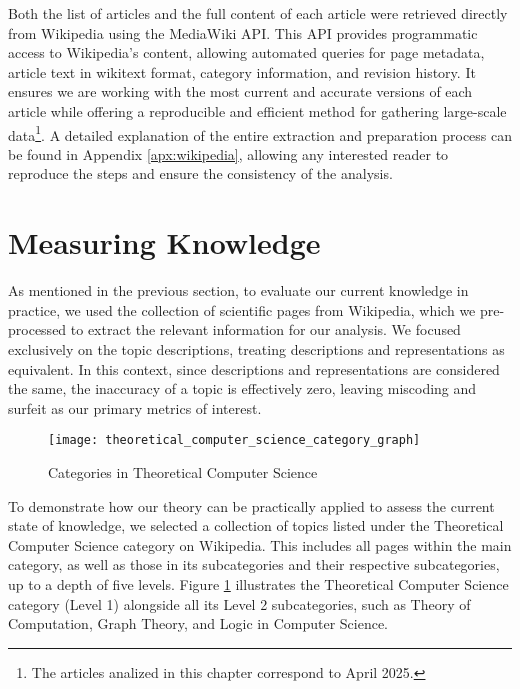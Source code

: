Both the list of articles and the full content of each article were retrieved directly from Wikipedia using the MediaWiki API. This API provides programmatic access to Wikipedia's content, allowing automated queries for page metadata, article text in wikitext format, category information, and revision history. It ensures we are working with the most current and accurate versions of each article while offering a reproducible and efficient method for gathering large-scale data\footnote{The articles analized in this chapter correspond to April 2025.}. A detailed explanation of the entire extraction and preparation process can be found in Appendix \ref{apx:wikipedia}, allowing any interested reader to reproduce the steps and ensure the consistency of the analysis.

%
%
\section{Measuring Knowledge}

As mentioned in the previous section, to evaluate our current knowledge in practice, we used the collection of scientific pages from Wikipedia, which we pre-processed to extract the relevant information for our analysis. We focused exclusively on the topic descriptions, treating descriptions and representations as equivalent. In this context, since descriptions and representations are considered the same, the inaccuracy of a topic is effectively zero, leaving miscoding and surfeit as our primary metrics of interest.

\begin{figure}[h]
\centering\texttt{[image: theoretical\_computer\_science\_category\_graph]}
\caption{\label{fig:theoretical_computer_science_category_graph}Categories in Theoretical Computer Science}
\end{figure}

To demonstrate how our theory can be practically applied to assess the current state of knowledge, we selected a collection of topics listed under the Theoretical Computer Science category on Wikipedia. This includes all pages within the main category, as well as those in its subcategories and their respective subcategories, up to a depth of five levels. Figure \ref{fig:theoretical_computer_science_category_graph} illustrates the Theoretical Computer Science category (Level 1) alongside all its Level 2 subcategories, such as Theory of Computation, Graph Theory, and Logic in Computer Science.

